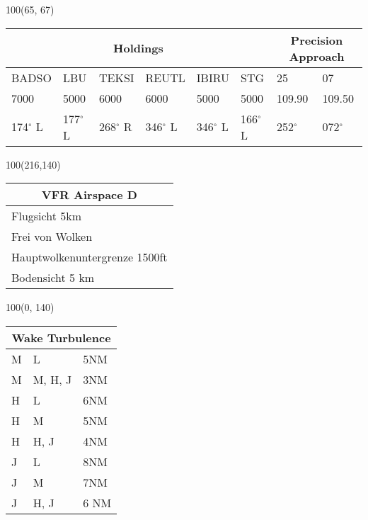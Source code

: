 \documentclass[10pt,landscape,a4paper]{article}
\begin{document}
\begin{textblock}{100}(65, 67)
\begin{table}[]
\begin{tabular}{llllllll} 
\multicolumn{6}{c}{\textbf{Holdings}}         & \multicolumn{2}{c}{\textbf{Precision Approach}}  \\ \hline
\multicolumn{1}{|l|}{BADSO} & 
\multicolumn{1}{l|}{LBU}   & 
\multicolumn{1}{l|}{TEKSI} & 
\multicolumn{1}{l|}{REUTL} &
\multicolumn{1}{l|}{IBIRU} &
\multicolumn{1}{l|}{STG} &
\multicolumn{1}{l|}{25} &
\multicolumn{1}{l|}{07} \\ \hline
\multicolumn{1}{|l|}{7000} & 
\multicolumn{1}{l|}{5000} & 
\multicolumn{1}{l|}{6000} & 
\multicolumn{1}{l|}{6000} &
\multicolumn{1}{l|}{5000} &
\multicolumn{1}{l|}{5000} & 
\multicolumn{1}{l|}{109.90} & 
\multicolumn{1}{l|}{109.50} \\ \hline
\multicolumn{1}{|l|}{174$^\circ$ L} & 
\multicolumn{1}{l|}{177$^\circ$ L} & 
\multicolumn{1}{l|}{268$^\circ$ R} & 
\multicolumn{1}{l|}{346$^\circ$ L} &
\multicolumn{1}{l|}{346$^\circ$ L} &
\multicolumn{1}{l|}{166$^\circ$ L} &
 \multicolumn{1}{l|}{252$^\circ$} & 
 \multicolumn{1}{l|}{072$^\circ$}\\ \hline
\end{tabular}
\end{table}
\end{textblock}

\begin{textblock}{100}(216,140)
\begin{table}[]
\begin{tabular}{|l|}
\multicolumn{1}{c}{\textbf{VFR Airspace D}} \\ \hline
 Flugsicht 5km   \\ \hline
Frei von Wolken   \\ \hline
Hauptwolkenuntergrenze 1500ft \\ \hline
Bodensicht 5 km \\ \hline
\end{tabular}
\end{table}
\end{textblock}

\begin{textblock}{100}(0, 140)
\begin{table}[]
\begin{tabular}{|l|l|l|}
\multicolumn{3}{c}{\textbf{Wake Turbulence}} \\ \hline
 M  & L  & 5NM   \\ \hline
 M  & M, H, J  & 3NM   \\ \hline
 H  & L & 6NM   \\ \hline
 H  & M & 5NM   \\ \hline
 H  & H, J & 4NM \\ \hline
 J &  L & 8NM \\ \hline
 J &  M & 7NM \\ \hline
 J &  H, J  & 6 NM   \\ \hline
\end{tabular}
\end{table}
\end{textblock}
\end{document}
